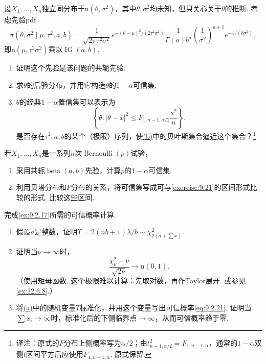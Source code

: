 \begin{exercise}\label{exercise:9.28}
设$X_1,\ldots,X_n$独立同分布于$\mathrm n(\theta,\sigma^2)$，其中$\theta,\sigma^2$均未知，但只关心关于$\theta$的推断. 考虑先验pdf
$$\pi(\theta,\sigma^2\mid\mu,\tau^2,a,b)=\frac1{\sqrt{2\pi\tau^2\sigma^2}}e^{-(\theta-\mu)^2/(2\tau^2\sigma^2)}\frac1{\Gamma(a)b^a}\left(\frac1{\sigma^2}\right)^{a+1}e^{-1/(b\sigma^2)},$$
即$\mathrm n(\mu,\tau^2\sigma^2)$乘以$\operatorname{IG}(a,b)$.
\begin{enumerate}
\item 证明这个先验是该问题的共轭先验.
\item\label{item:9.28.b}求$\theta$的后验分布，并用它构造$\theta$的$1-\alpha$可信集.
\item $\theta$的经典$1-\alpha$置信集可以表示为
$$\left\{\theta:|\theta-\bar x|^2\le F_{1,n-1,\alpha/2}\frac{s^2}n\right\}.$$
是否存在$\tau^2,a,b$的某个（极限）序列，使\hyperref[item:9.28.b]{(b)}中的贝叶斯集合逼近这个集合？\footnote{译注：原式的$F$分布上侧概率写为$\alpha/2$；由$t_{n-1,\alpha/2}^2=F_{1,n-1,\alpha}$，通常的$1-\alpha$双侧$t$区间平方后应使用$F_{1,n-1,\alpha}$. 原式保留.}
\end{enumerate}
\end{exercise}
\begin{exercise}\label{exercise:9.29}
若$X_1,\ldots,X_n$是一系列$n$次$\operatorname{Bernoulli}(p)$试验，
\begin{enumerate}
\item 采用共轭$\operatorname{beta}(a,b)$先验，计算$p$的$1-\alpha$可信集.
\item 利用贝塔分布和$F$分布的关系，将可信集写成可与\autoref{exercise:9.21}的区间形式比较的形式. 比较这些区间.
\end{enumerate}
\end{exercise}
\begin{exercise}\label{exercise:9.30}
完成\autoref{ex:9.2.17}所需的可信概率计算.
\begin{enumerate}
\item\label{item:9.30.a}假设$a$是整数，证明$T=2(nb+1)\lambda/b\sim\chi^2_{2(a+\sum x)}$.
\item 证明当$\nu\to\infty$时，
$$\frac{\chi^2_\nu-\nu}{\sqrt{2\nu}}\to\mathrm n(0,1).$$
（使用矩母函数. 这个极限难以计算：先取对数，再作Taylor展开. 或参见\autoref{ex:12.6.8}.）
\item 将\hyperref[item:9.30.a]{(a)}中的随机变量$T$标准化，并用这个变量写出可信概率\eqref{eq:9.2.21}. 证明当$\sum x_i\to\infty$时，标准化后的下侧临界点$\to\infty$，从而可信概率趋于零.
\end{enumerate}
\end{exercise}
